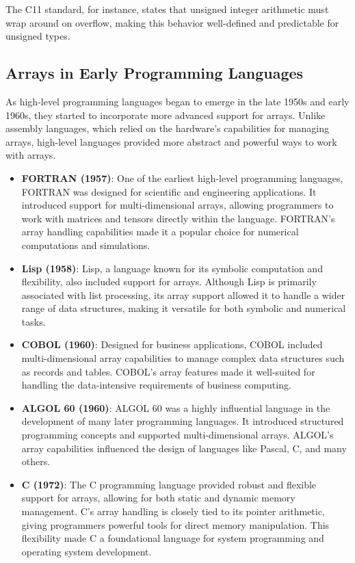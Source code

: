 \documentclass{book}
\begin{document}
The C11 standard, for instance, states that unsigned integer arithmetic must wrap around on overflow, making this behavior well-defined and predictable for unsigned types.

	\subsection{Arrays in Early Programming Languages}
	
	As high-level programming languages began to emerge in the late 1950s and early 1960s, they started to incorporate more advanced support for arrays. Unlike assembly languages, which relied on the hardware's capabilities for managing arrays, high-level languages provided more abstract and powerful ways to work with arrays.
	
	\begin{itemize}
		\item \textbf{FORTRAN (1957)}: One of the earliest high-level programming languages, FORTRAN was designed for scientific and engineering applications. It introduced support for multi-dimensional arrays, allowing programmers to work with matrices and tensors directly within the language. FORTRAN's array handling capabilities made it a popular choice for numerical computations and simulations.
		
		\item \textbf{Lisp (1958)}: Lisp, a language known for its symbolic computation and flexibility, also included support for arrays. Although Lisp is primarily associated with list processing, its array support allowed it to handle a wider range of data structures, making it versatile for both symbolic and numerical tasks.
		
		\item \textbf{COBOL (1960)}: Designed for business applications, COBOL included multi-dimensional array capabilities to manage complex data structures such as records and tables. COBOL's array features made it well-suited for handling the data-intensive requirements of business computing.
		
		\item \textbf{ALGOL 60 (1960)}: ALGOL 60 was a highly influential language in the development of many later programming languages. It introduced structured programming concepts and supported multi-dimensional arrays. ALGOL's array capabilities influenced the design of languages like Pascal, C, and many others.
		
		\item \textbf{C (1972)}: The C programming language provided robust and flexible support for arrays, allowing for both static and dynamic memory management. C's array handling is closely tied to its pointer arithmetic, giving programmers powerful tools for direct memory manipulation. This flexibility made C a foundational language for system programming and operating system development.
	\end{itemize}
\end{document}
